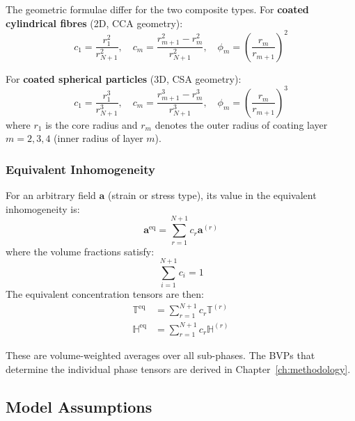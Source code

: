 \documentclass[oneside, 12pt, a4paper, bibliography=totoc]{book}
\newcommand{\bs}[1]{\bm{#1}}                       %
\begin{document}
The geometric formulae differ for the two composite types. For \textbf{coated cylindrical fibres} (2D, CCA geometry):
%
\begin{equation}
    c_1 = \frac{r_1^2}{r_{N+1}^2}, \quad c_m = \frac{r_{m+1}^2 - r_m^2}{r_{N+1}^2}, \quad \phi_m = \left(\frac{r_m}{r_{m+1}}\right)^2
    \label{eq:volume_fractions_cylindrical}
\end{equation}

For \textbf{coated spherical particles} (3D, CSA geometry):
%
\begin{equation}
    c_1 = \frac{r_1^3}{r_{N+1}^3}, \quad c_m = \frac{r_{m+1}^3 - r_m^3}{r_{N+1}^3}, \quad \phi_m = \left(\frac{r_m}{r_{m+1}}\right)^3
    \label{eq:volume_fractions_spherical}
\end{equation}
%
where $r_1$ is the core radius and $r_m$ denotes the outer radius of coating layer $m = 2,3,4$ (inner radius of layer $m$).




\subsubsection{Equivalent Inhomogeneity}
\label{subsec:equivalent_inhomogeneity}

For an arbitrary field $\bs{a}$ (strain or stress type), its value in the equivalent inhomogeneity is:
%
\begin{equation}
    \bs{a}^{\text{eq}} = \sum_{r=1}^{N+1} c_r \bs{a}^{(r)}
    \label{eq:equivalent_field}
\end{equation}
%
where the volume fractions satisfy:
%
\begin{equation}
    \sum_{i=1}^{N+1} c_i = 1
    \label{eq:volume_constraint}
\end{equation}
The equivalent concentration tensors are then:
%
\begin{align}
    \mathbb{T}^{\text{eq}} &= \sum_{r=1}^{N+1} c_r \mathbb{T}^{(r)} \label{eq:Teq}\\
    \mathbb{H}^{\text{eq}} &= \sum_{r=1}^{N+1} c_r \mathbb{H}^{(r)} \label{eq:Heq}
\end{align}

These are volume-weighted averages over all sub-phases. The BVPs that determine the individual phase tensors are derived in Chapter~\ref{ch:methodology}.


\subsection{Model Assumptions}
\label{subsec:interphase_assumptions}
\end{document}
